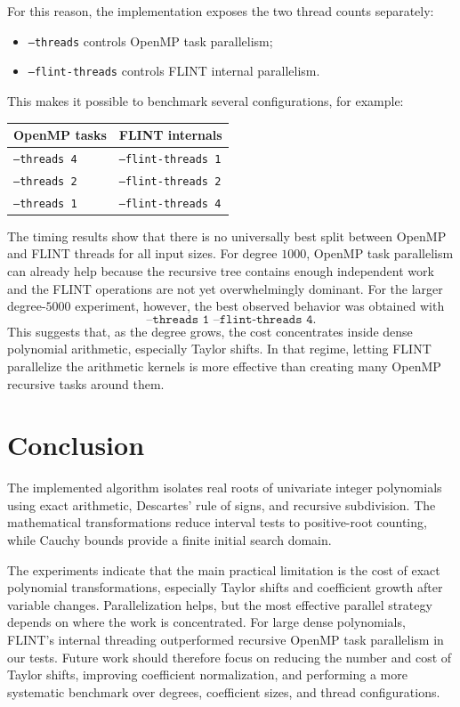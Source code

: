 \documentclass[letterpaper]{article}
\begin{document}
For this reason, the implementation exposes the two thread counts separately:
\begin{itemize}
  \item \texttt{--threads} controls OpenMP task parallelism;
  \item \texttt{--flint-threads} controls FLINT internal parallelism.
\end{itemize}
This makes it possible to benchmark several configurations, for example:
\begin{center}
\begin{tabular}{ll}
\toprule
OpenMP tasks & FLINT internals \\
\midrule
\texttt{--threads 4} & \texttt{--flint-threads 1} \\
\texttt{--threads 2} & \texttt{--flint-threads 2} \\
\texttt{--threads 1} & \texttt{--flint-threads 4} \\
\bottomrule
\end{tabular}
\end{center}

The timing results show that there is no universally best split between
OpenMP and FLINT threads for all input sizes. For degree $1000$, OpenMP task
parallelism can already help because the recursive tree contains enough
independent work and the FLINT operations are not yet overwhelmingly
dominant. For the larger degree-$5000$ experiment, however, the best observed
behavior was obtained with
\[
  \texttt{--threads 1 --flint-threads 4}.
\]
This suggests that, as the degree grows, the cost concentrates inside dense
polynomial arithmetic, especially Taylor shifts. In that regime, letting FLINT
parallelize the arithmetic kernels is more effective than creating many
OpenMP recursive tasks around them.

\section{Conclusion}

The implemented algorithm isolates real roots of univariate integer
polynomials using exact arithmetic, Descartes' rule of signs, and recursive
subdivision. The mathematical transformations reduce interval tests to
positive-root counting, while Cauchy bounds provide a finite initial search
domain.

The experiments indicate that the main practical limitation is the cost of
exact polynomial transformations, especially Taylor shifts and coefficient
growth after variable changes. Parallelization helps, but the most effective
parallel strategy depends on where the work is concentrated. For large dense
polynomials, FLINT's internal threading outperformed recursive OpenMP task
parallelism in our tests. Future work should therefore focus on reducing the
number and cost of Taylor shifts, improving coefficient normalization, and
performing a more systematic benchmark over degrees, coefficient sizes, and
thread configurations.

\printbibliography
\end{document}
